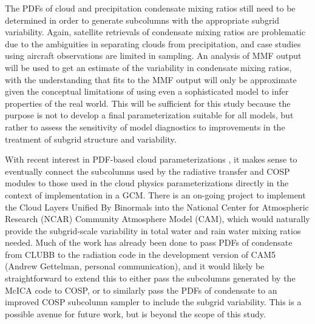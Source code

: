 \documentclass[letter]{article}
\begin{document}
The PDFs of cloud and precipitation condensate mixing ratios still need to be determined in order to generate subcolumns with the appropriate subgrid variability. Again, satellite retrievals of condensate mixing ratios are problematic due to the ambiguities in separating clouds from precipitation, and case studies using aircraft observations are limited in sampling.  An analysis of MMF output will be used to get an estimate of the variability in condensate mixing ratios, with the understanding that fits to the MMF output will only be approximate given the conceptual limitations of using even a sophisticated model to infer properties of the real world. This will be sufficient for this study because the purpose is not to develop a final parameterization suitable for all models, but rather to assess the sensitivity of model diagnostics to improvements in the treatment of subgrid structure and variability.

With recent interest in PDF-based cloud parameterizations \citep[e.g.,][]{tompkins_2002}, it makes sense to eventually connect the subcolumns used by the radiative transfer and COSP modules to those used in the cloud physics parameterizations directly in the context of implementation in a GCM. There is an on-going project to implement the Cloud Layers Unified By Binormals \citep[CLUBB][]{golaz_et_al_2002} into the National Center for Atmospheric Research (NCAR) Community Atmosphere Model (CAM), which would naturally provide the subgrid-scale variability in total water and rain water mixing ratios needed. Much of the work has already been done to pass PDFs of condensate from CLUBB to the radiation code in the development version of CAM5 (Andrew Gettelman, personal communication), and it would likely be straightforward to extend this to either pass the subcolumns generated by the McICA code to COSP, or to similarly pass the PDFs of condensate to an improved COSP subcolumn sampler to include the subgrid variability. This is a possible avenue for future work, but is beyond the scope of this study.

\end{document}
